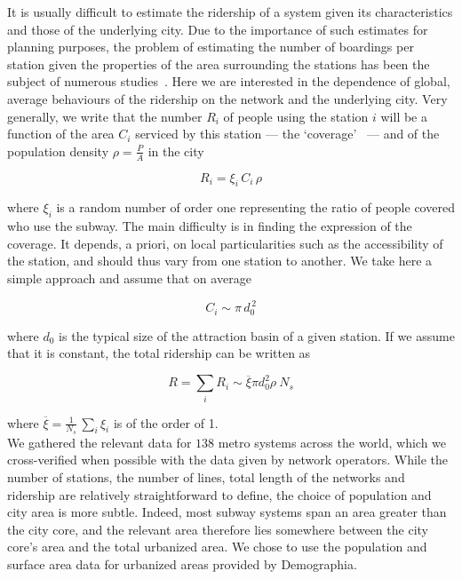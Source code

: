 It is usually difficult to estimate the ridership of a system given its
characteristics and those of the underlying city. Due to the importance of such
estimates for planning purposes, the problem of estimating the number of
boardings per station given the properties of the area surrounding the stations
has been the subject of numerous studies~\cite{Matsunaka:2013,Kuby:2004}. Here
we are interested in the dependence of global, average behaviours of the
ridership on the network and the underlying city. Very generally, we write that
the number $R_i$ of people using the station $i$ will be a function of the area
$C_i$ serviced by this station --- the `coverage'~\cite{Derrible:2009} --- and
of the population density $\rho = \frac{P}{A}$ in the city

\begin{equation}
    R_i = \xi_i\, C_i\, \rho
\end{equation}

where $\xi_i$ is a random number of order one representing the ratio of people
covered who use the subway. The main difficulty is in finding the expression of
the coverage. It depends, a priori, on local particularities such as the
accessibility of the station, and should thus vary from one station to another.
We take here a simple approach and assume that on average

\begin{equation}
    C_i \sim \pi\, d_0^{\,2}
\end{equation}

where  $d_0$ is the typical size of the attraction basin of a given station. If
we assume that it is constant, the total ridership can be written as

\begin{equation}
    R = \sum_i R_i \sim \overline{\xi} \pi d_0^2 \rho \: N_s
    \label{eq:ridership}
\end{equation}

where $\overline{\xi} = \frac{1}{N_s}\,\sum_i \xi_i$ is of the order of 1.\\

We gathered the relevant data for $138$ metro systems across the world, which we
cross-verified when possible with the data given by network operators. While the
number of stations, the number of lines, total length of the networks and
ridership are relatively straightforward to define, the choice of population and
city area is more subtle. Indeed, most subway systems span an area greater than
the city core, and the relevant area therefore lies somewhere between the city
core's area and the total urbanized area. We chose to use the population and
surface area data for urbanized areas provided by Demographia.

